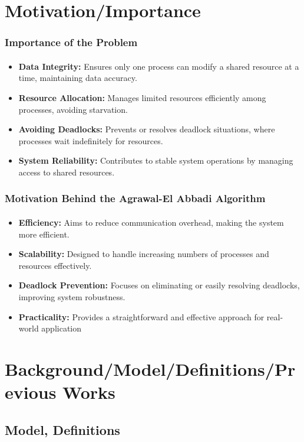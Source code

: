 \documentclass[11pt]{beamer}              %
\begin{document}
\section{Motivation/Importance}
\begin{frame}
\frametitle{Importance of the Problem}
\framesubtitle{}

\begin{itemize}
  \item \textbf{Data Integrity:} Ensures only one process can modify a shared resource at a time, maintaining data accuracy.
  \item \textbf{Resource Allocation:} Manages limited resources efficiently among processes, avoiding starvation.
  \item \textbf{Avoiding Deadlocks:} Prevents or resolves deadlock situations, where processes wait indefinitely for resources.
  \item \textbf{System Reliability:} Contributes to stable system operations by managing access to shared resources.
\end{itemize}

\end{frame}

\begin{frame}
\frametitle{Motivation Behind the Agrawal-El Abbadi Algorithm}
\framesubtitle{}

\begin{itemize}
  \item \textbf{Efficiency:} Aims to reduce communication overhead, making the system more efficient.
  \item \textbf{Scalability:} Designed to handle increasing numbers of processes and resources effectively.
  \item \textbf{Deadlock Prevention:} Focuses on eliminating or easily resolving deadlocks, improving system robustness.
  \item \textbf{Practicality:} Provides a straightforward and effective approach for real-world application
\end{itemize}

\end{frame}


\section{Background/Model/Definitions/Previous Works}


\subsection{Model, Definitions}
\end{document}
